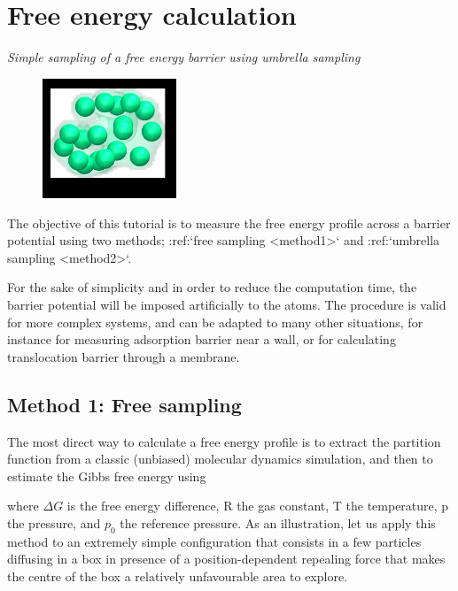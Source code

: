 \chapter{Free energy calculation}

\vspace{-1cm} \noindent \textcolor{graytitle}{\textit{{\Large Simple sampling of a free energy barrier using umbrella sampling}}\vspace{0.5cm} }

\noindent \hspace{-0.45cm}\begin{figure}
\includegraphics[width=4cm]{tutorials/level3/free-energy-calculation/avatar_light.png}
\end{figure}

\noindent The objective of this tutorial is to measure the free
energy profile across a barrier potential using two methods;
:ref:`free sampling <method1>` and :ref:`umbrella sampling <method2>`.

For the sake of simplicity and in order to reduce the computation time, the
barrier potential will be imposed artificially to the atoms.
The procedure is valid for more complex
systems, and can be adapted to many other situations, for instance 
for measuring adsorption barrier near a wall, or for calculating translocation
barrier through a membrane.

\section{Method 1: Free sampling}

\noindent The most direct way to calculate a free energy profile is to extract
the partition function from a classic (unbiased) molecular
dynamics simulation, and then to estimate the Gibbs free
energy using 

where $\Delta G$ is the free energy difference, R the
gas constant, T the temperature, p the
pressure, and $p_0$ the reference pressure.
As an illustration, let us apply this method to an
extremely simple configuration that consists in a few
particles diffusing in a box in presence of a
position-dependent repealing force that makes the centre
of the box a relatively unfavourable area to explore.

